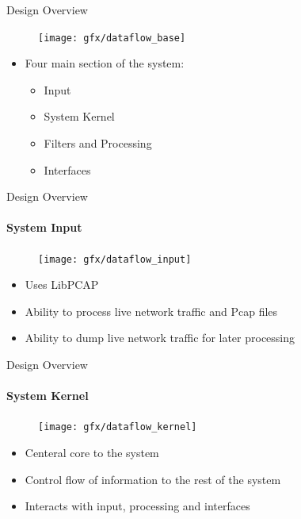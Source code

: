 \documentclass{beamer}
\begin{document}
\begin{frame}{Design Overview}
    \begin{figure}
        \vspace{-2em}
        \centering
        \texttt{[image: gfx/dataflow\_base]}
        \vspace{-3em}
    \end{figure}
    \begin{itemize}
        \item{Four main section of the system:}
        \begin{multicols}{2}
            \begin{itemize}
                \item{Input}
                \item{System Kernel}
                \item{Filters and Processing}
                \item{Interfaces}
            \end{itemize}
        \end{multicols}
    \end{itemize}
\end{frame}


\begin{frame}{Design Overview}
    \framesubtitle{System Input}
    \begin{figure}
        \vspace{-2em}
        \centering
        \texttt{[image: gfx/dataflow\_input]}
        \vspace{-3em}
    \end{figure}
    \begin{itemize}
        \item{Uses LibPCAP}
        \item{Ability to process live network traffic and Pcap files}
        \item{Ability to dump live network traffic for later processing}
    \end{itemize}
\end{frame}


\begin{frame}{Design Overview}
    \framesubtitle{System Kernel}
    \begin{figure}
        \vspace{-2em}
        \centering
        \texttt{[image: gfx/dataflow\_kernel]}
        \vspace{-3em}
    \end{figure}
    \begin{itemize}
        \item{Centeral core to the system}
        \item{Control flow of information to the rest of the system}
        \item{Interacts with input, processing and interfaces}
    \end{itemize}
\end{frame}
\end{document}
